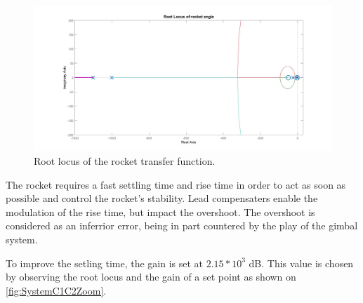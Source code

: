 \begin{figure}[htbp]
	\centering
	
		\includegraphics[width=\textwidth]{figures/Rocket/design/tf_with_controller_1_vf}
		\caption{Root locus of the rocket transfer function.}
		\label{fig:SystemC1C2}
		
\end{figure}

The rocket requires a fast settling time and rise time in order to act as soon as possible and control the rocket's stability. Lead compensaters enable the modulation of the rise time, but impact the overshoot. The overshoot is considered as an inferrior error, being in part countered by the play of the gimbal system. 

To improve the setling time, the gain is set at $2.15 * 10^3$ \si{\dB}. This value is chosen by observing the root locus and the gain of a set point as shown on \autoref{fig:SystemC1C2Zoom}.

